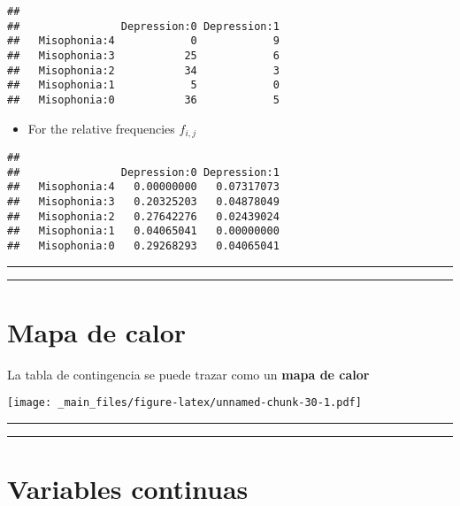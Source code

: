 \documentclass[
]{book}
\providecommand{\tightlist}{%
  \setlength{\itemsep}{0pt}\setlength{\parskip}{0pt}}
\begin{document}
\begin{verbatim}
##               
##                Depression:0 Depression:1
##   Misophonia:4            0            9
##   Misophonia:3           25            6
##   Misophonia:2           34            3
##   Misophonia:1            5            0
##   Misophonia:0           36            5
\end{verbatim}

\begin{itemize}
\tightlist
\item
  For the relative frequencies \(f_{i,j}\)
\end{itemize}

\begin{verbatim}
##               
##                Depression:0 Depression:1
##   Misophonia:4   0.00000000   0.07317073
##   Misophonia:3   0.20325203   0.04878049
##   Misophonia:2   0.27642276   0.02439024
##   Misophonia:1   0.04065041   0.00000000
##   Misophonia:0   0.29268293   0.04065041
\end{verbatim}

\begin{center}\rule{0.5\linewidth}{0.5pt}\end{center}

\begin{center}\rule{0.5\linewidth}{0.5pt}\end{center}

\hypertarget{mapa-de-calor}{%
\section{Mapa de calor}\label{mapa-de-calor}}

La tabla de contingencia se puede trazar como un \textbf{mapa de calor}

\texttt{[image: \_main\_files/figure-latex/unnamed-chunk-30-1.pdf]}

\begin{center}\rule{0.5\linewidth}{0.5pt}\end{center}

\begin{center}\rule{0.5\linewidth}{0.5pt}\end{center}

\hypertarget{variables-continuas-1}{%
\section{Variables continuas}\label{variables-continuas-1}}
\end{document}
